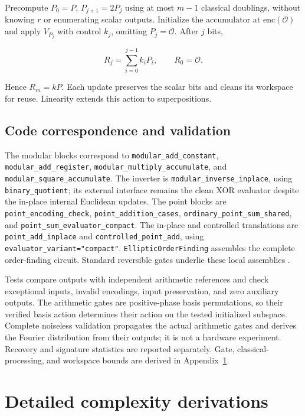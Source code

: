 \begin{revision}
Precompute $P_0=P$, $P_{j+1}=2P_j$ using at most $m-1$ classical doublings, without knowing $r$ or enumerating scalar outputs. Initialize the accumulator at $\mathrm{enc}(\mathcal O)$ and apply $V_{P_j}$ with control $k_j$, omitting $P_j=\mathcal O$. After $j$ bits,

\begin{equation}
    \label{eq:partial_scalar_accumulation}
R_j=\sum_{i=0}^{j-1}k_iP_i,\qquad R_0=\mathcal O.
\end{equation}

Hence $R_m=kP$. Each update preserves the scalar bits and cleans its workspace for reuse. Linearity extends this action to superpositions.

\subsection{Code correspondence and validation}

The modular blocks correspond to \texttt{modular\_add\_constant}, \texttt{modular\_add\_register}, \texttt{modular\_multiply\_accumulate}, and \texttt{modular\_square\_accumulate}. The inverter is \texttt{modular\_inverse\_inplace}, using \texttt{binary\_quotient}; its external interface remains the clean XOR evaluator despite the in-place internal Euclidean updates. The point blocks are \texttt{point\_encoding\_check}, \texttt{point\_addition\_cases}, \texttt{ordinary\_point\_sum\_shared}, and \texttt{point\_sum\_evaluator\_compact}. The in-place and controlled translations are \texttt{point\_add\_inplace} and \texttt{controlled\_point\_add}, using \texttt{evaluator\_variant="compact"}. \texttt{EllipticOrderFinding} assembles the complete order-finding circuit. Standard reversible gates underlie these local assemblies \cite{Barenco1995,NielsenChuang2010}.

Tests compare outputs with independent arithmetic references and check exceptional inputs, invalid encodings, input preservation, and zero auxiliary outputs. The arithmetic gates are positive-phase basis permutations, so their verified basis action determines their action on the tested initialized subspace. Complete noiseless validation propagates the actual arithmetic gates and derives the Fourier distribution from their outputs; it is not a hardware experiment. Recovery and signature statistics are reported separately. Gate, classical-processing, and workspace bounds are derived in Appendix~\ref{app:complexity}.

\section{Detailed complexity derivations}
\label{app:complexity}


\end{revision}
